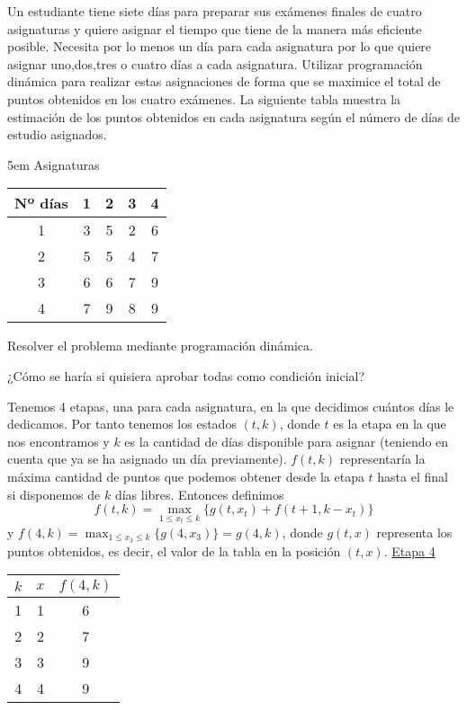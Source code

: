 \documentclass[twoside]{article}
\begin{document}
\newpage 
\begin{ejercicio}{4}
Un estudiante tiene siete días para preparar sus exámenes finales de cuatro asignaturas y
quiere asignar el tiempo que tiene de la manera más eficiente posible. Necesita por lo menos un
día para cada asignatura por lo que quiere asignar uno,dos,tres o cuatro días a cada asignatura.
Utilizar programación dinámica para realizar estas asignaciones de forma que se maximice el total
de puntos obtenidos en los cuatro exámenes. La siguiente tabla muestra la estimación de los puntos
obtenidos en cada asignatura según el número de días de estudio asignados.
\begin{center}
5em Asignaturas\\
\begin{tabular}{c|c c c c}
Nº días & 1 & 2 & 3 & 4\\
\hline
1 & 3 & 5 & 2 & 6\\
2 & 5 & 5 & 4 & 7\\
3 & 6 & 6 & 7 & 9\\
4 & 7 & 9 & 8 & 9
\end{tabular}
\end{center}
Resolver el problema mediante programación dinámica.
\begin{nota}
¿Cómo se haría si quisiera aprobar todas como condición inicial?
\end{nota}
\begin{solucion}
Tenemos 4 etapas, una para cada asignatura, en la que decidimos cuántos días le dedicamos. Por tanto tenemos los estados $(t,k)$, donde $t$ es la etapa en la que nos encontramos y $k$ es la cantidad de días disponible para asignar (teniendo en cuenta que ya se ha asignado un día previamente). $f(t,k)$ representaría la máxima cantidad de puntos que podemos obtener desde la etapa $t$ hasta el final si disponemos de $k$ días libres. Entonces definimos
$$f(t,k)=\max_{1\leq x_t\leq k}\{g(t,x_t)+f(t+1,k-x_t)\}$$ y $f(4,k)=\max_{1\leq x_3\leq k}\{g(4,x_3)\}=g(4,k)$, donde $g(t,x)$ representa los puntos obtenidos, es decir, el valor de la tabla en la posición $(t,x)$.
\underline{Etapa 4}
\begin{center}
\begin{tabular}{|c|c|c|}
\hline
$k$ & $x$ & $f(4,k)$\\
\hline
1 & 1 & 6\\
2 & 2 & 7\\
3 & 3 & 9\\
4 & 4 & 9\\
\hline
\end{tabular}

\end{center}
\end{solucion}
\end{ejercicio}
\end{document}
